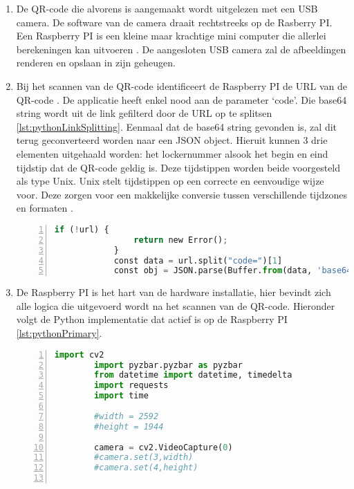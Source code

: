 \begin{enumerate}
    \item De QR-code die alvorens is aangemaakt wordt uitgelezen met een USB camera. De software van de camera draait rechtstreeks op de Rasberry PI. Een Raspberry PI is een kleine maar krachtige mini computer die allerlei berekeningen kan uitvoeren \autocite{Richardson2013}. De aangesloten USB camera zal de afbeeldingen renderen en opslaan in zijn geheugen.
    \item Bij het scannen van de QR-code identificeert de Raspberry PI de URL van de QR-code \autocite{Weir2012}. De applicatie heeft enkel nood aan de parameter ‘code’. Die base64 string wordt uit de link gefilterd door de URL op te splitsen \ref{lst:pythonLinkSplitting}. Eenmaal dat de base64 string gevonden is, zal dit terug geconverteerd worden naar een \ac{JSON} object. Hieruit kunnen 3 drie elementen uitgehaald worden: het lockernummer alsook het begin en eind tijdstip dat de QR-code geldig is. Deze tijdstippen worden beide voorgesteld als type Unix. Unix stelt tijdstippen op een correcte en eenvoudige wijze voor. Deze zorgen voor een makkelijke conversie tussen verschillende tijdzones en formaten \autocite{Ritchie1978}.

        \begin{lstlisting}[language=Python, caption={Python script om parameter code uit de link te halen.}, label={lst:pythonLinkSplitting}, numbers=left]
            if (!url) {
                return new Error();
            }
            const data = url.split("code=")[1]
            const obj = JSON.parse(Buffer.from(data, 'base64').toString('utf8')); 
        \end{lstlisting}

    
    \item 
    De Raspberry PI is het hart van de hardware installatie, hier bevindt zich alle logica die uitgevoerd wordt na het scannen van de QR-code. Hieronder volgt de Python implementatie dat actief is op de Raspberry PI \ref{lst:pythonPrimary}.
    
    \begin{lstlisting}[language=Python, caption={Het primaire uitvoerbare script van de QR-unit.}, label={lst:pythonPrimary}, numbers=left]
        import cv2
        import pyzbar.pyzbar as pyzbar
        from datetime import datetime, timedelta
        import requests
        import time
        
        #width = 2592
        #height = 1944
        
        camera = cv2.VideoCapture(0)
        #camera.set(3,width)
        #camera.set(4,height)
        

\end{lstlisting}
\end{enumerate}
